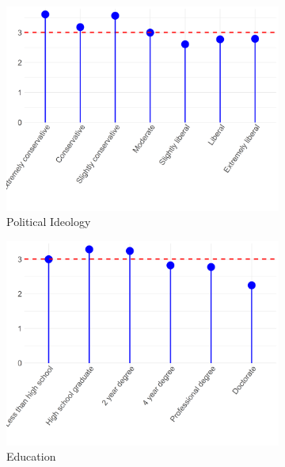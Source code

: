 \documentclass[12pt]{article}
\begin{document}
\begin{figure}[ht!]
    \captionsetup[subfigure]{font=footnotesize,labelfont=footnotesize}
    \centering
     \begin{subfigure}[b]{0.3\textwidth}
        \includegraphics[width=1.0\textwidth]{Plots/uni-dist-grd-int-pol.png}
            \caption{Political Ideology}
            \label{fig:grd-int-pol}
    \end{subfigure}
     \begin{subfigure}[b]{0.3\textwidth}
        \includegraphics[width=1.0\textwidth]{Plots/uni-dist-grd-int-edu.png}
            \caption{Education}
            \label{fig:grd-int-edu}
    \end{subfigure}
     \begin{subfigure}[b]{0.3\textwidth}

\end{subfigure}
\end{figure}
\end{document}
